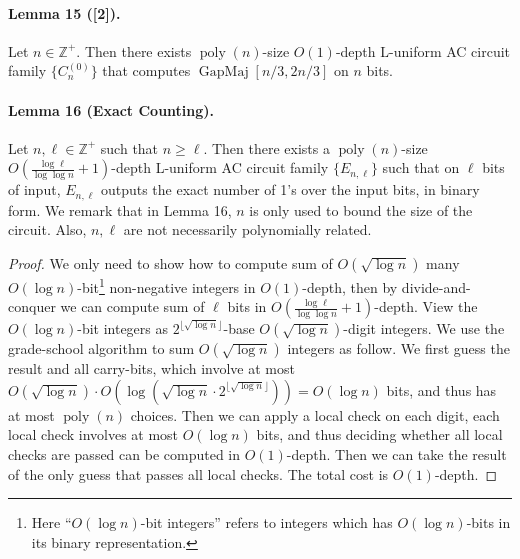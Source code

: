 \documentclass[10pt,a4paper]{article}
\begin{document}
\paragraph{Lemma 15 ([2]).} Let $n\in\mathbb Z^+$. Then there exists $\operatorname{poly}(n)$-size $O(1)$-depth L-uniform AC circuit family $\{C_n^{(0)}\}$ that computes $\operatorname{GapMaj}[n/3,2n/3]$ on $n$ bits.
\paragraph{Lemma 16 (Exact Counting).} Let $n,\ell\in\mathbb Z^+$ such that $n\ge\ell$. Then there exists a $\operatorname{poly}(n)$-size $O\left(\frac{\log\ell}{\log\log n}+1\right)$-depth L-uniform AC circuit family $\{E_{n,\ell}\}$ such that on $\ell$ bits of input, $E_{n,\ell}$ outputs the exact number of 1's over the input bits, in binary form.
We remark that in Lemma 16, $n$ is only used to bound the size of the circuit. Also, $n,\ell$ are not necessarily polynomially related.
\begin{proof}
We only need to show how to compute sum of $O(\sqrt{\log n})$ many $O(\log n)$-bit\footnote{Here ``$O(\log n)$-bit integers'' refers to integers which has $O(\log n)$-bits in its binary representation.} non-negative integers in $O(1)$-depth, then by divide-and-conquer we can compute sum of $\ell$ bits in $O\left(\frac{\log\ell}{\log\log n}+1\right)$-depth.
View the $O(\log n)$-bit integers as $2^{\lfloor\sqrt{\log n}\rfloor}$-base $O(\sqrt{\log n})$-digit integers. We use the grade-school algorithm to sum $O(\sqrt{\log n})$ integers as follow. We first guess the result and all carry-bits, which involve at most $O(\sqrt{\log n})\cdot O\left(\log\left(\sqrt{\log n}\cdot2^{\lfloor\sqrt{\log n}\rfloor}\right)\right)=O(\log n)$ bits, and thus has at most $\operatorname{poly}(n)$ choices. Then we can apply a local check on each digit, each local check involves at most $O(\log n)$ bits, and thus deciding whether all local checks are passed can be computed in $O(1)$-depth. Then we can take the result of the only guess that passes all local checks. The total cost is $O(1)$-depth.
\end{proof}
\end{document}
